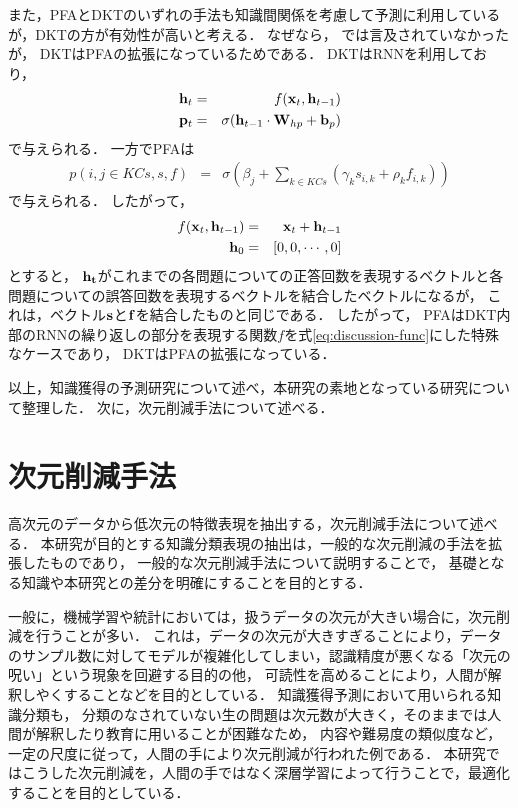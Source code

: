 また，PFAとDKTのいずれの手法も知識間関係を考慮して予測に利用しているが，DKTの方が有効性が高いと考える．
なぜなら，
\cite{piech2015deep}では言及されていなかったが，
DKTはPFAの拡張になっているためである．
DKTはRNNを利用しており，
\begin{eqnarray}
{\bf h}_t & = & f({\bf x}_t, {\bf h}_{t-1})\\
{\bf p}_t & = & \sigma({\bf h}_{t-1} \cdot {\bf W}_{hp} + {\bf b}_p)
\end{eqnarray}
で与えられる．
一方でPFAは
\begin{eqnarray}
	p(i, j \in KCs, s, f) & = & \sigma( \beta _j + \sum_{k \in KCs}(\gamma_k s_{i, k} + \rho _k f_{i, k}) )
\end{eqnarray}
で与えられる．
したがって，
\begin{eqnarray}
\label{eq:discussion-func}
	f({\bf x}_t, {\bf h}_{t-1}) &=& {\bf x}_t + {\bf h}_{t-1}\\
	{\bf h}_{0} & = & [0, 0, \cdots , 0]
\end{eqnarray}
とすると，
${\bf h_t}$がこれまでの各問題についての正答回数を表現するベクトルと各問題についての誤答回数を表現するベクトルを結合したベクトルになるが， 
これは，ベクトル${\bf s}$と${\bf f}$を結合したものと同じである．
したがって，
PFAはDKT内部のRNNの繰り返しの部分を表現する関数$f$を式\ref{eq:discussion-func}にした特殊なケースであり，
DKTはPFAの拡張になっている．

\vvspace
以上，知識獲得の予測研究について述べ，本研究の素地となっている研究について整理した．
次に，次元削減手法について述べる．


\section{次元削減手法}
高次元のデータから低次元の特徴表現を抽出する，次元削減手法について述べる．
本研究が目的とする知識分類表現の抽出は，一般的な次元削減の手法を拡張したものであり，
一般的な次元削減手法について説明することで，
基礎となる知識や本研究との差分を明確にすることを目的とする．


一般に，機械学習や統計においては，扱うデータの次元が大きい場合に，次元削減を行うことが多い．
これは，データの次元が大きすぎることにより，データのサンプル数に対してモデルが複雑化してしまい，認識精度が悪くなる「次元の呪い」\cite{bellman1957dynamic,friedman1997bias}という現象を回避する目的の他，
可読性を高めることにより，人間が解釈しやくすることなどを目的としている．
知識獲得予測において用いられる知識分類も，
分類のなされていない生の問題は次元数が大きく，そのままでは人間が解釈したり教育に用いることが困難なため，
内容や難易度の類似度など，一定の尺度に従って，人間の手により次元削減が行われた例である．
本研究ではこうした次元削減を，人間の手ではなく深層学習によって行うことで，最適化することを目的としている．


